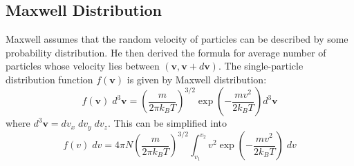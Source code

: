 \documentclass[../../../Main.tex]{subfiles}
\begin{document}
\subsection*{Maxwell Distribution} 
Maxwell assumes that the random velocity of particles can be described by some probability distribution. He then derived the formula for average number of particles whose velocity lies between $(\mathbf{v},\mathbf{v}+d\mathbf{v})$. The single-particle distribution function $f(\mathbf{v})$ is given by Maxwell distribution:
\begin{equation*}
    f(\mathbf{v})\;d^3\mathbf{v}=\left(\frac{m}{2\pi k_B T}\right)^{3/2}\exp\left(-\frac{m v^2}{2k_B T}\right)d^3\mathbf{v}
\end{equation*} 
where $d^3\mathbf{v}=dv_x\; dv_y\; dv_z$. This can be simplified into
\begin{equation*}
    f(v)\;dv=4\pi N\left(\frac{m}{2\pi k_B T}\right)^{3/2}\int_{v_1}^{v_2} v^2\exp\left(-\frac{m v^2}{2k_B T}\right)\;dv
\end{equation*}
\end{document}
